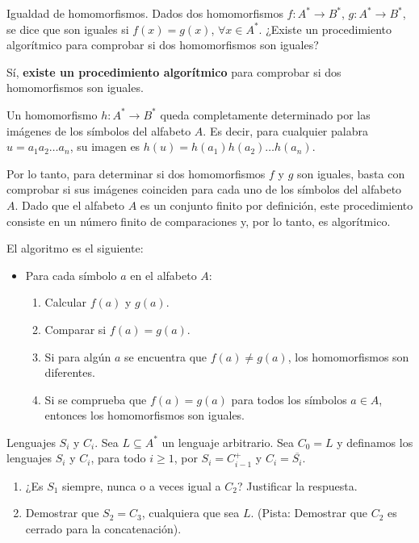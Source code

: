 \documentclass[12pt]{book} %
\begin{document}
\begin{ejercicio}
Igualdad de homomorfismos. Dados dos homomorfismos $f : A^* \to B^*$, $g : A^* \to B^*$, se dice que son iguales si $f(x) = g(x)$, $\forall x \in A^*$. ¿Existe un procedimiento algorítmico para comprobar si dos homomorfismos son iguales?
\end{ejercicio}

\begin{solucion}

Sí, \textbf{existe un procedimiento algorítmico} para comprobar si dos homomorfismos son iguales.

Un homomorfismo \( h: A^* \to B^* \) queda completamente determinado por las imágenes de los símbolos del alfabeto \( A \). Es decir, para cualquier palabra \( u = a_1a_2\ldots a_n \), su imagen es \( h(u) = h(a_1)h(a_2)\ldots h(a_n) \).

Por lo tanto, para determinar si dos homomorfismos \( f \) y \( g \) son iguales, basta con comprobar si sus imágenes coinciden para cada uno de los símbolos del alfabeto \( A \). Dado que el alfabeto \( A \) es un conjunto finito por definición, este procedimiento consiste en un número finito de comparaciones y, por lo tanto, es algorítmico.

El algoritmo es el siguiente:
\begin{itemize}
    \item Para cada símbolo \( a \) en el alfabeto \( A \):
    \begin{enumerate}
        \item Calcular \( f(a) \) y \( g(a) \).
        \item Comparar si \( f(a) = g(a) \).
        \item Si para algún \( a \) se encuentra que \( f(a) \neq g(a) \), los homomorfismos son diferentes.
        \item Si se comprueba que \( f(a) = g(a) \) para todos los símbolos \( a \in A \), entonces los homomorfismos son iguales.
    \end{enumerate}
\end{itemize}

\end{solucion}

\begin{ejercicio}
Lenguajes $S_i$ y $C_i$. 
Sea $L \subseteq A^*$ un lenguaje arbitrario. Sea $C_0 = L$ y definamos los lenguajes $S_i$ y $C_i$, para todo $i \geq 1$, por $S_i = C_{i-1}^+$ y $C_i = \overline{S_i}$. 

\begin{enumerate}[label=\alph*)]
    \item ¿Es $S_1$ siempre, nunca o a veces igual a $C_2$? Justificar la respuesta.  

    \item Demostrar que $S_2 = C_3$, cualquiera que sea $L$. (Pista: Demostrar que $C_2$ es cerrado para la concatenación).
\end{enumerate}

\end{ejercicio}
\end{document}
